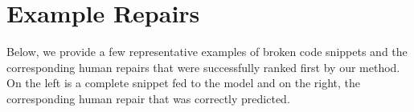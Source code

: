 \documentclass[sigplan,review,acmsmall,nonacm,anonymous]{acmart}\settopmatter{printfolios=false,printccs=false,printacmref=false}
\begin{document}
%
%
%
%  
  \clearpage

  \pagebreak\appendix

  \section{Example Repairs}\label{sec:exaple_repairs}

  Below, we provide a few representative examples of broken code snippets and the corresponding human repairs that were successfully ranked first by our method. On the left is a complete snippet fed to the model and on the right, the corresponding human repair that was correctly predicted.
\end{document}
